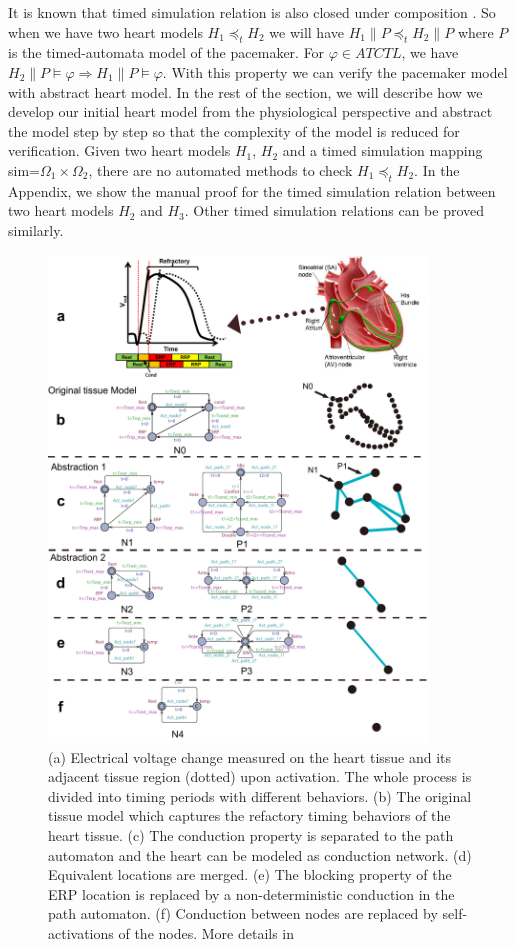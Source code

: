 It is known that timed simulation relation is also closed under composition \cite{simulation}. So when we have two heart models $H_1\preceq_t H_2$ we will have $H_1\| P\preceq_t H_2\| P$ where $P$ is the timed-automata model of the pacemaker. For $\varphi\in ATCTL$, we have $H_2\| P\models\varphi\Rightarrow H_1\| P\models\varphi$. With this property we can verify the pacemaker model with abstract heart model. In the rest of the section, we will describe how we develop our initial heart model from the physiological perspective and abstract the model step by step so that the complexity of the model is reduced for verification. Given two heart models $H_1$, $H_2$ and a timed simulation mapping \textsf{sim}=$\Omega_1\times\Omega_2$, there are no automated methods to check $H_1\preceq_t H_2$. In the Appendix, we show the manual proof for the timed simulation relation between two heart models $H_2$ and $H_3$. Other timed simulation relations can be proved similarly.
\begin{figure}[!t]
\center
\includegraphics[width=0.9\textwidth]{figs/Heart_abs.pdf}
\caption{(a) Electrical voltage change measured on the heart tissue and its adjacent tissue region (dotted) upon activation. The whole process is divided into timing periods with different behaviors. (b) The original tissue model which captures the refactory timing behaviors of the heart tissue. (c) The conduction property is separated to the path automaton and the heart can be modeled as conduction network. (d) Equivalent locations are merged. (e) The blocking property of the ERP location is replaced by a non-deterministic conduction in the path automaton. (f) Conduction between nodes are replaced by self-activations of the nodes. More details in \cite{STTT13}}
\label{fig:HM_abs}
\end{figure} 
